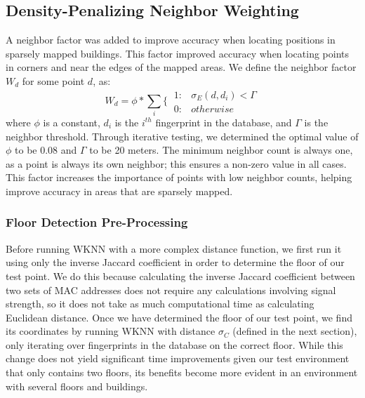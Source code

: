 \documentclass[conference]{IEEEtran}
\begin{document}
\subsection{Density-Penalizing Neighbor Weighting}
\indent A neighbor factor was added to improve accuracy when locating positions in sparsely mapped buildings. This factor improved accuracy when locating points in corners and near the edges of the mapped areas. We define the neighbor factor $W_d$ for some point $d$, as:
\begin{equation}
\label{density}
W_d=\phi*\sum\limits_{i}\{\
\begin{array}{lr}
       1: &  \sigma_E(d, d_i) < \Gamma \\
       0: &  otherwise
\end{array}
\end{equation}
\indent where $\phi$ is a constant, $d_i$ is the $i^{th}$ fingerprint in the database, and $\Gamma$ is the neighbor threshold. Through iterative testing, we determined the optimal value of $\phi$ to be 0.08 and $\Gamma$ to be 20 meters. The minimum neighbor count is always one, as a point is always its own neighbor; this ensures a non-zero value in all cases. This factor increases the importance of points with low neighbor counts, helping improve accuracy in areas that are sparsely mapped. 

\subsubsection{Floor Detection Pre-Processing}
\indent Before running WKNN with a more complex distance function, we first run it using only the inverse Jaccard coefficient in order to determine the floor of our test point. We do this because calculating the inverse Jaccard coefficient between two sets of MAC addresses does not require any calculations involving signal strength, so it does not take as much computational time as calculating Euclidean distance. Once we have determined the floor of our test point, we find its coordinates by running WKNN with distance $\sigma_C$ (defined in the next section), only iterating over fingerprints in the database on the correct floor. While this change does not yield significant time improvements given our test environment that only contains two floors, its benefits become more evident in an environment with several floors and buildings.
\end{document}
